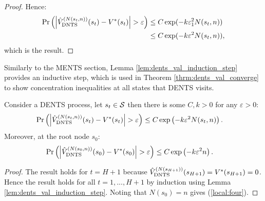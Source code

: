\begin{proof}
            Hence:
            \begin{align}
                \Pr\left(\left|{\hat{V}^{(N(s_t,n))}_{{\textnormal{DNTS}}}}(s_t)-V^*(s_t)\right| > \varepsilon\right) 
                    &\leq C \exp(-k \varepsilon_1^2 N(s_t,n)) \\
                    &\leq C \exp(-k \varepsilon^2 N(s_t,n)),
            \end{align}
            which is the result.
        \end{proof}














        Similarly to the MENTS section, Lemma \ref{lem:dents_val_induction_step} provides an inductive step, which is used in Theorem \ref{thrm:dents_val_converge} to show concentration inequalities at all states that DENTS visits.
            
        \begin{theorem} \label{thrm:dents_val_converge}
            Consider a DENTS process, let $s_t\in\mathcal{S}$ then there is some $C,k>0$ for any $\varepsilon>0$:
            \begin{align}
                \Pr\left(\left| {\hat{V}^{(N(s_{t},n))}_{{\textnormal{DNTS}}}}(s_t) - V^*(s_{t}) \right| > \varepsilon \right) 
                    &\leq C\exp\left( -k\varepsilon^2 N(s_{t},n) \right).
            \end{align}
            Moreover, at the root node $s_0$:
            \begin{align}
                \Pr\left(\left| {\hat{V}^{(N(s_{0},n))}_{{\textnormal{DNTS}}}}(s_0) - V^*(s_0) \right| > \varepsilon \right) 
                    &\leq C\exp\left( -k\varepsilon^2 n \right). \label{local:four}
            \end{align}
        \end{theorem}
        \begin{proof}
            The result holds for $t=H+1$  because ${\hat{V}^{(N(s_{H+1}))}_{{\textnormal{DNTS}}}}(s_{H+1})=V^*(s_{H+1})=0$.  Hence the result holds for all $t=1,...,H+1$ by induction using Lemma \ref{lem:dents_val_induction_step}. Noting that $N(s_0)=n$ gives (\ref{local:four}).
        \end{proof}









